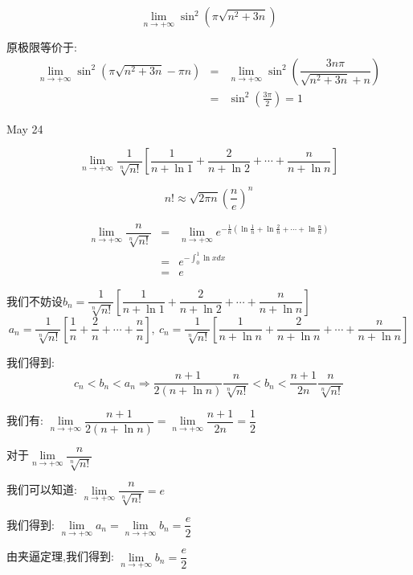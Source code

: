 \begin{example}[][Exam: 31.4.4]
	$$\lim\limits_{n\to+\infty}\sin^{2}(\pi\sqrt{n^2+3n})$$
\end{example}

\begin{solution}
	
	原极限等价于: 
	\begin{eqnarray*}
		\lim\limits_{n\to+\infty}\sin^{2}(\pi\sqrt{n^2+3n}-\pi n)&=&\lim\limits_{n\to+\infty}\sin^{2}(\dfrac{3n\pi }{\sqrt{n^2+3n}+n})\\
		&=&\sin^2(\frac{3\pi}{2})=1
	\end{eqnarray*}	
\end{solution}


\textcolor{purplea}{May 24}

\begin{example}[][Exam: 31.4.5]
	$$\lim\limits_{n\to +\infty}\dfrac{1}{\sqrt[n]{n!}}\left[\dfrac{1}{n+\ln 1}+\dfrac{2}{n+\ln 2}+\cdots+\dfrac{n}{n+\ln n} \right]$$
\end{example}

\begin{lemma}[斯特林公式]\label{lem: 斯特林公式}
	$$n!\approx \sqrt{2\pi n}(\dfrac{n}{e})^n$$
\end{lemma}
\begin{anymark}[注]
	\begin{eqnarray*}
		\lim\limits_{n\to +\infty}\dfrac{n}{\sqrt[n]{n!}}
		& = &\lim\limits_{n\to +\infty}e^{-\frac{1}{n}(\ln\frac{1}{n}+\ln\frac{2}{n}+\cdots+\ln\frac{n}{n})}\\
		& = &e^{-\int_{0}^{1}\ln x dx}\\
		& = &e
	\end{eqnarray*}
\end{anymark}
\begin{solution}
	
	我们不妨设$b_{n}=\dfrac{1}{\sqrt[n]{n!}}\left[\dfrac{1}{n+\ln 1}+\dfrac{2}{n+\ln 2}+\cdots+\dfrac{n}{n+\ln n} \right]$
	$$a_{n}=\dfrac{1}{\sqrt[n]{n!}}[\frac{1}{n}+\frac{2}{n}+\cdots+\frac{n}{n}],\ c_{n}=\dfrac{1}{\sqrt[n]{n!}}[\frac{1}{n+\ln n}+\frac{2}{n+\ln n}+\cdots+\frac{n}{n+\ln n}]$$
	
	我们得到: 
	$$c_{n}<b_{n}<a_{n}\Rightarrow \dfrac{n+1}{2(n+\ln n)}\dfrac{n}{\sqrt[n]{n!}}<b_{n}<\dfrac{n+1}{2n}\dfrac{n}{\sqrt[n]{n!}}$$
	
	我们有: $\lim\limits_{n\to +\infty}\dfrac{n+1}{2(n+\ln n)}=\lim\limits_{n\to +\infty}\dfrac{n+1}{2n}=\dfrac{1}{2}$
	
	对于$\lim\limits_{n\to +\infty}\dfrac{n}{\sqrt[n]{n!}}$
	
	我们可以知道: $\lim\limits_{n\to +\infty}\dfrac{n}{\sqrt[n]{n!}}=e$
	
	我们得到: $\lim\limits_{n\to +\infty}a_{n}=\lim\limits_{n\to +\infty}b_{n}=\dfrac{e}{2}$
	
	由夹逼定理,我们得到: $\lim\limits_{n\to +\infty}b_{n}=\dfrac{e}{2}$
\end{solution}

